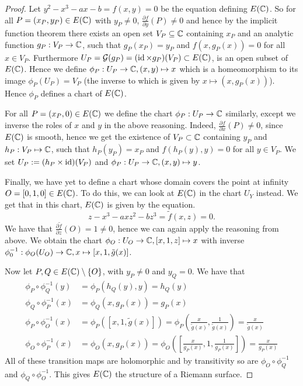 \begin{proof}
	Let $y^2 - x^3 - ax - b = f(x, y) = 0$ be the equation defining $E(\mathbb{C})$.
	So for all $P = (x_P, y_P) \in E(\mathbb{C})$ with $y_P \neq 0$,
	$\frac{\partial f}{\partial y}(P) \neq 0$ and hence by the implicit function
	theorem there exists an open set $V_P \subseteq \mathbb{C}$ containing $x_P$ and an
	analytic function $g_P: V_P \to \mathbb{C}$, such that $g_P(x_P) = y_P$ and
	$f(x, g_P(x)) = 0$ for all $x \in V_P$. 
	Furthermore $U_P = \mathcal{G}(g_P) = (\operatorname{id}\times g_P)(V_P) \subset E(\mathbb{C})$,
	is an open subset of $E(\mathbb{C})$.
	Hence we define
	$\phi_P: U_P \to \mathbb{C}, (x, y) \mapsto x$ which is a homeomorphism to its
	image $\phi_P(U_P) = V_P$ (the inverse to which is given by
	$x \mapsto (x, g_P(x))$). Hence $\phi_P$ defines a chart of $E(\mathbb{C})$.

	For all $P = (x_P, 0) \in E(\mathbb{C})$ we define the chart $\phi_P: U_P \to \mathbb{C}$
	similarly, except we inverse the roles of $x$ and $y$ in the above reasoning.
	Indeed, $\frac{\partial f}{\partial x}(P) \neq 0$, since $E(\mathbb{C})$ is smooth,
	hence we get the existence of $V_P \subset \mathbb{C}$ containing $y_P$ and
	$h_P: V_P \mapsto \mathbb{C}$, such that $h_P(y_P) = x_P$ and
	$f(h_P(y), y) = 0$ for all $y \in V_P$. We set
	$U_P := (h_P \times \operatorname{id})(V_P)$ and 
	$\phi_P: U_P \to \mathbb{C}, (x, y) \mapsto y$.

	Finally, we have yet to define a chart whose domain covers the point at
	infinity $O = [0, 1, 0] \in E(\mathbb{C})$. To do this, we can look at $E(\mathbb{C})$ in
	the chart $U_Y$ instead. We get that in this chart, $E(\mathbb{C})$ is given by
	the equation. 
	\begin{equation*}
		z - x^3 - axz^2 - bz^3 = \tilde f(x, z) = 0.
	\end{equation*}
	We have that $\frac{\partial \tilde f}{\partial z} (O) = 1 \neq 0$, hence we
	can again apply the reasoning from above. We obtain the chart
	$\phi_O: U_O \to \mathbb{C}, [x, 1, z] \mapsto x$ with inverse
	$\phi_0^{-1}: \phi_O(U_O) \to \mathbb{C}, x \mapsto [x, 1, \tilde g(x)]$.

	Now let $P, Q \in E(\mathbb{C}) \setminus \{O\}$, with $y_P \neq 0$ and $y_Q = 0$.
	We have that
	\begin{align*}
		\phi_P \circ \phi_Q^{-1} (y) &= \phi_P(h_Q(y), y) = h_Q(y)\\
		\phi_Q \circ \phi_P^{-1} (x) &= \phi_{Q}(x, g_P(x)) = g_P(x)\\
		\phi_P\circ \phi_O^{-1}(x) &= \phi_P([x, 1, \tilde g(x)])
		= \phi_P\left(\frac{x}{\tilde g(x)},
		\frac{1}{\tilde g(x)}\right) = \frac{x}{\tilde g(x)}\\
		\phi_O\circ \phi_P^{-1}(x) &= \phi_O(x, g_P(x))
		= \phi_O\left(\left[\frac{x}{g_P(x)}, 1, \frac{1}{g_P(x)}\right]\right)
		= \frac{x}{g_P(x)}
	\end{align*}
	All of these transition maps are holomorphic and by transitivity so are
	$\phi_O \circ \phi_Q^{-1}$ and $\phi_Q \circ \phi_O^{-1}$.
	This gives $E(\mathbb{C})$ the structure of a Riemann surface.
\end{proof}

